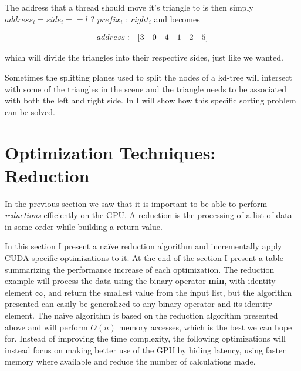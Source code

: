 The address that a thread should move it's triangle to is then simply
$address_i = side_i == l$ ? $prefix_i$ : $right_i$ and becomes


\begin{displaymath}
  \begin{array} {r r r r r r r}
    address: & [3 & 0 & 4 & 1 & 2 & 5]
  \end{array}
\end{displaymath}

which will divide the triangles into their respective sides, just like
we wanted.

Sometimes the splitting planes used to split the nodes of a kd-tree will
intersect with some of the triangles in the scene and the triangle needs to be
associated with both the left and right side. In  I
will show how this specific sorting problem can be solved.





\section{Optimization Techniques: Reduction}\label{sec:reduce}


In the previous section we saw that it is important to be able to perform
\textit{reductions} efficiently on the GPU. A reduction is the processing of a
list of data in some order while building a return value.


In this section I present a naïve reduction algorithm and incrementally apply
CUDA specific optimizations to it. At the end of the section I present a table
summarizing the performance increase of each optimization. The reduction example
will process the data using the binary operator \textbf{min}, with identity
element $\infty$, and return the smallest value from the input list, but the
algorithm presented can easily be generalized to any binary operator and its
identity element. The naïve algorithm is based on the reduction algorithm
presented above and will perform $O(n)$ memory accesses, which is the best we
can hope for. Instead of improving the time complexity, the following
optimizations will instead focus on making better use of the GPU by hiding
latency, using faster memory where available and reduce the number of
calculations made.


